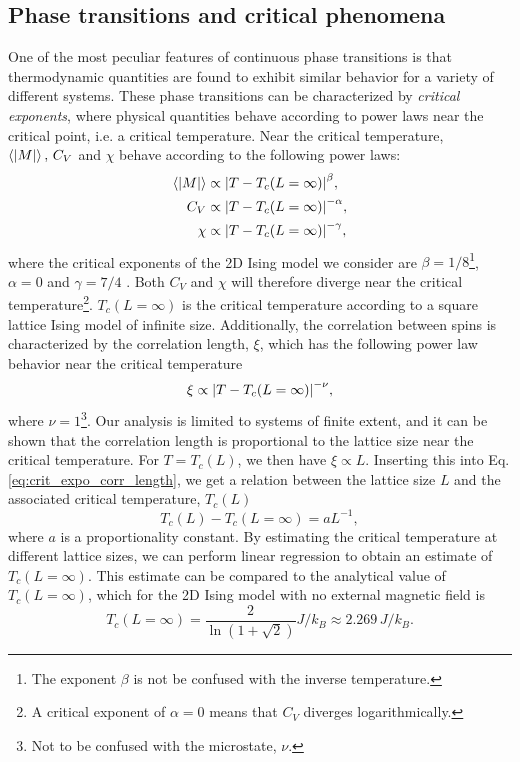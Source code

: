 \subsection{Phase transitions and critical phenomena}\label{subsec_theory:PT_critical_phenomena}
One of the most peculiar features of continuous phase transitions is that thermodynamic quantities are found to exhibit similar behavior for a variety of different systems. These phase transitions can be characterized by \textit{critical exponents}, where physical quantities behave according to power laws near the critical point, i.e. a critical temperature. Near the critical temperature, $\expval{\abs{M}},\,C_V$ and $\chi$ behave according to the following power laws: 
\begin{align}
    \expval{\abs{M}} & \propto \abs{T - T_c(L=\infty)}^\beta, \label{eq:crit_expo_mag} \\
    C_V & \propto \abs{T - T_c(L=\infty)}^{-\alpha}, \label{eq:crit_expo_heatcap} \\ 
    \chi & \propto \abs{T - T_c(L=\infty)}^{-\gamma}, \label{eq:crit_expo_mag_susc}
\end{align}
where the critical exponents of the 2D Ising model we consider are $\beta=1/8$\footnote{The exponent $\beta$ is not be confused with the inverse temperature.}, $\alpha=0$ and $\gamma=7/4$ \cite{crit_expo}. Both $C_V$ and $\chi$ will therefore diverge near the critical temperature\footnote{A critical exponent of $\alpha=0$ means that $C_V$ diverges logarithmically.}. $T_c(L=\infty)$ is the critical temperature according to a square lattice Ising model of infinite size. Additionally, the correlation between spins is characterized by the correlation length, $\xi$, which has the following power law behavior near the critical temperature 
\begin{equation}
    \xi \propto \abs{T - T_c(L=\infty)}^{-\nu}, \label{eq:crit_expo_corr_length}
\end{equation}
where $\nu=1$\footnote{Not to be confused with the microstate, $\nu$.}. Our analysis is limited to systems of finite extent, and it can be shown  that the correlation length is proportional to the lattice size near the critical temperature. For $T=T_c(L)$, we then have $\xi\propto L$. Inserting this into Eq. \eqref{eq:crit_expo_corr_length}, we get a relation between the lattice size $L$ and the associated critical temperature, $T_c(L)$
\begin{equation}
    T_c(L) - T_c(L=\infty) = aL^{-1}, \label{eq:finite_size_scaling_relation}
\end{equation}  
where $a$ is a proportionality constant. By estimating the critical temperature at different lattice sizes, we can perform linear regression to obtain an estimate of $T_c(L=\infty)$. This estimate can be compared to the analytical value of $T_c(L=\infty)$, which for the 2D Ising model with no external magnetic field is \cite{Onsager_Ising2D}
\begin{equation}
    T_c(L=\infty) = \frac{2}{\ln(1+\sqrt{2})} J/k_B \approx 2.269\,J/k_B. \label{eq:onsager_critical_temperature}
\end{equation}


